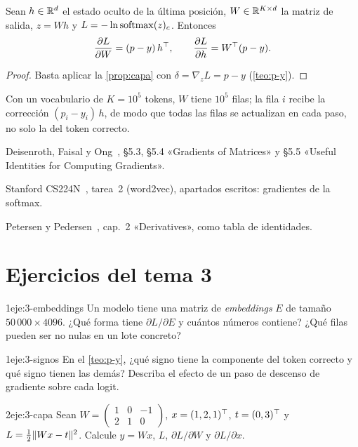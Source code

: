 \begin{corolario}\label{cor:salida}
Sean $h\in\mathbb{R}^{d}$ el estado oculto de la última posición, $W\in\mathbb{R}^{K\times d}$ la matriz de salida, $z=Wh$ y $L=-\ln\operatorname{softmax}(z)_c$. Entonces
\[
\frac{\partial L}{\partial W}=(p-y)\,h^{\top},\qquad\frac{\partial L}{\partial h}=W^{\top}(p-y).
\]
\end{corolario}

\begin{proof}
Basta aplicar la \cref{prop:capa} con $\delta=\nabla_z L=p-y$ (\cref{teo:p-y}).
\end{proof}

Con un vocabulario de $K=10^{5}$ tokens, $W$ tiene $10^{5}$ filas; la fila $i$ recibe la corrección $(p_i-y_i)\,h$, de modo que todas las filas se actualizan en cada paso, no solo la del token correcto.

\begin{lecturas}
\item Deisenroth, Faisal y Ong~\cite{mml}, §5.3, §5.4 «Gradients of Matrices» y §5.5 «Useful Identities for Computing Gradients».
\item Stanford CS224N~\cite{cs224n}, tarea~2 (word2vec), apartados escritos: gradientes de la softmax.
\item Petersen y Pedersen~\cite{cookbook}, cap.~2 «Derivatives», como tabla de identidades.
\end{lecturas}

\section*{Ejercicios del tema 3}

\begin{ejercicio}{1}{eje:3-embeddings}
Un modelo tiene una matriz de \emph{embeddings} $E$ de tamaño $50\,000\times 4096$. ¿Qué forma tiene $\partial L/\partial E$ y cuántos números contiene? ¿Qué filas pueden ser no nulas en un lote concreto?
\end{ejercicio}

\begin{ejercicio}{1}{eje:3-signos}
En el \cref{teo:p-y}, ¿qué signo tiene la componente del token correcto y qué signo tienen las demás? Describa el efecto de un paso de descenso de gradiente sobre cada logit.
\end{ejercicio}

\begin{ejercicio}{2}{eje:3-capa}
Sean $W=\begin{pmatrix}1&0&-1\\2&1&0\end{pmatrix}$, $x=(1,2,1)^{\top}$, $t=(0,3)^{\top}$ y $L=\tfrac12\lVert Wx-t\rVert^{2}$. Calcule $y=Wx$, $L$, $\partial L/\partial W$ y $\partial L/\partial x$.
\end{ejercicio}

